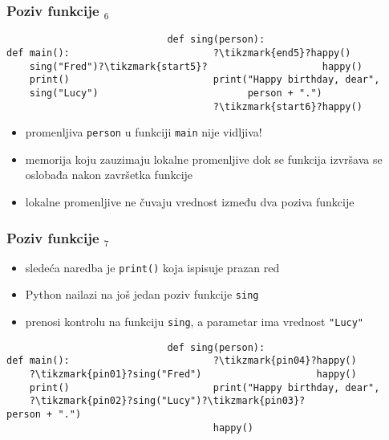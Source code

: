 \documentclass[utf8,compress,aspectratio=169]{beamer}
\begin{document}
\begin{frame}[fragile]
  \frametitle{Poziv funkcije $_6$}
\begin{verbatim}
                            def sing(person):
def main():                         ?\tikzmark{end5}?happy()
    sing("Fred")?\tikzmark{start5}?                    happy()
    print()                         print("Happy birthday, dear",
    sing("Lucy")                          person + ".")
                                    ?\tikzmark{start6}?happy()
\end{verbatim}
\begin{itemize}
    \item promenljiva \texttt{person} u funkciji \texttt{main} nije vidljiva!
    \item memorija koju zauzimaju lokalne promenljive dok se funkcija izvršava se oslobađa nakon završetka funkcije
    \item lokalne promenljive ne čuvaju vrednost između dva poziva funkcije
  \end{itemize}
\end{frame}

\begin{frame}[fragile]
  \frametitle{Poziv funkcije $_7$}
  \begin{itemize}
    \item sledeća naredba je \texttt{print()} koja ispisuje prazan red
    \item Python nailazi na još jedan poziv funkcije \texttt{sing}
    \item prenosi kontrolu na funkciju \texttt{sing}, a parametar ima vrednost \texttt{"Lucy"}
  \end{itemize}
\begin{verbatim}
                            def sing(person):
def main():                         ?\tikzmark{pin04}?happy()
    ?\tikzmark{pin01}?sing("Fred")                    happy()
    print()                         print("Happy birthday, dear",
    ?\tikzmark{pin02}?sing("Lucy")?\tikzmark{pin03}?                          person + ".")
                                    happy()
\end{verbatim}
\end{frame}
\end{document}
